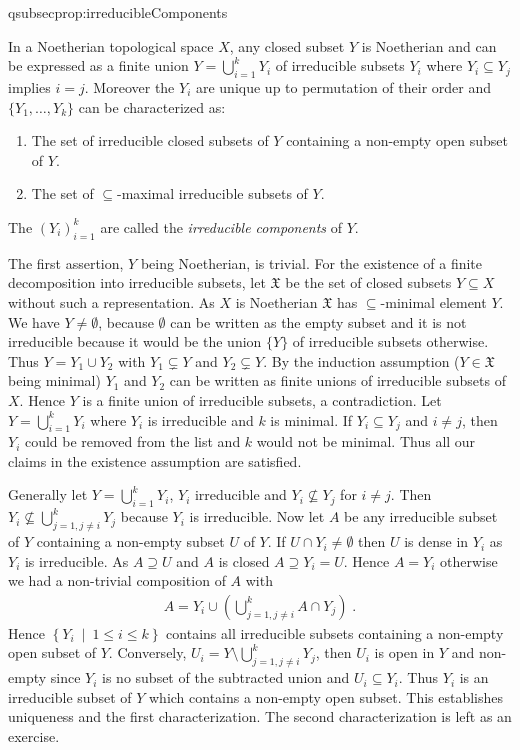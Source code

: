 \documentclass[DIV=14,parskip=full,pointednumbers]{scrartcl}
\renewenvironment{itemize}{\begin{enumerate}[label={$\bullet$},ref=\curthm]}{\end{enumerate}}
\theoremstyle{cthm}
\theoremstyle{cvarthm}
\renewenvironment{proof}[1][\proofname]
{\pushQED{\qed}\topsep0pt \partopsep0pt\trivlist\item[\hskip\labelsep\itshape #1.] }{\popQED\endtrivlist\addvspace{6pt plus 6pt}}
\theoremstyle{cdef}
\newcommand{\lbl}[1]{
	\label{#1}
	\ifmmode
	\expandafter\xdef\csname eqsubsec#1\endcsname{\thesubsection}
	\fi
}
\newcommand{\XX}{\mathfrak{X}}
\newcommand{\st}{\ \middle|\ }
\begin{document}
	\begin{prop}[a.k.a. Proposition 2]\lbl{prop:irreducibleComponents}
		In a Noetherian topological space $X$, any closed subset $Y$ is Noetherian and can be expressed as a finite union $Y= \bigcup_{i=1}^k Y_i$ of irreducible subsets $Y_i$ where $Y_i\subseteq Y_j$ implies $i=j$. Moreover the $Y_i$ are unique up to permutation of their order and $\{Y_1,\ldots, Y_k\}$ can be characterized as:
		\begin{itemize}
			\item The set of irreducible closed subsets of $Y$ containing a non-empty open subset of $Y$.
			\item The set of $\subseteq$-maximal irreducible subsets of $Y$.
		\end{itemize}
		The $(Y_i)_{i=1}^k$ are called the \emph{irreducible components} of $Y$.
	\end{prop}
	\begin{proof}
		The first assertion, $Y$ being Noetherian, is trivial. For the existence of a finite decomposition into irreducible subsets, let $\XX$ be the set of closed subsets $Y\subseteq X$ without such a representation. As $X$ is Noetherian $\XX$ has $\subseteq $-minimal element $Y$. We have $Y\neq \emptyset$, because $\emptyset$ can be written as the empty subset and it is not irreducible because it would be the union $\{Y\}$ of irreducible subsets otherwise. Thus $Y= Y_1\cup Y_2$ with $Y_1\subsetneq Y$ and $Y_2\subsetneq Y$. By the induction assumption ($Y\in \XX$ being minimal) $Y_1$ and $Y_2$ can be written as finite unions of irreducible subsets of $X$. Hence $Y$ is a finite union of irreducible subsets, a contradiction. Let $Y=\bigcup_{i=1}^k Y_i$ where $Y_i$ is irreducible and $k$ is minimal. If $Y_i\subseteq Y_j$ and $i\neq j$, then $Y_i$ could be removed from the list and $k$ would not be minimal. Thus all our claims in the existence assumption are satisfied.
		
		Generally let $Y=\bigcup_{i=1}^kY_i$, $Y_i$ irreducible and $Y_i\not\subseteq Y_j$ for $i\neq j$. Then $Y_i\not\subseteq \bigcup_{j=1, j\neq i}^k Y_j$ because $Y_i$ is irreducible. Now let $A$ be any irreducible subset of $Y$ containing a non-empty subset $U$ of $Y$. If $U\cap Y_i\neq \emptyset$ then $U$ is dense in $Y_i$ as $Y_i$ is irreducible. As $A\supseteq U$ and $A$ is closed $A\supseteq Y_i = U$. Hence $A=Y_i$ otherwise we had a non-trivial composition of $A$ with 
		\begin{align*}
		A= Y_i \cup \left(\bigcup_{j=1, j\neq i}^k A\cap Y_j\right)\;.
		\end{align*}
		Hence $\left\{ Y_i\st 1\leq i \leq k\right\}$ contains all irreducible subsets containing a non-empty open subset of $Y$. Conversely, $U_i = Y\setminus \bigcup_{j=1, j\neq i}^k Y_j$, then $U_i$ is open in $Y$ and non-empty since $Y_i$ is no subset of the subtracted union and $U_i\subseteq Y_i$. Thus $Y_i$ is an irreducible subset of $Y$ which contains a non-empty open subset. This establishes uniqueness and the first characterization. The second characterization is left as an exercise.
	\end{proof}
	
\end{document}
